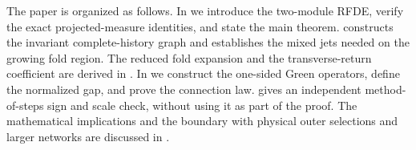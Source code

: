 The paper is organized as follows.  In  we introduce
the two-module RFDE, verify the exact projected-measure identities, and state
the main theorem.   constructs the invariant
complete-history graph and establishes the mixed jets needed on the growing
fold region.  The reduced fold expansion and the transverse-return
coefficient are derived in .  In  we
construct the one-sided Green operators, define the normalized gap, and
prove the connection law.   gives an independent
method-of-steps sign and scale check, without using it as part of the proof.
The mathematical implications and the boundary with physical outer
selections and larger networks are discussed in .
